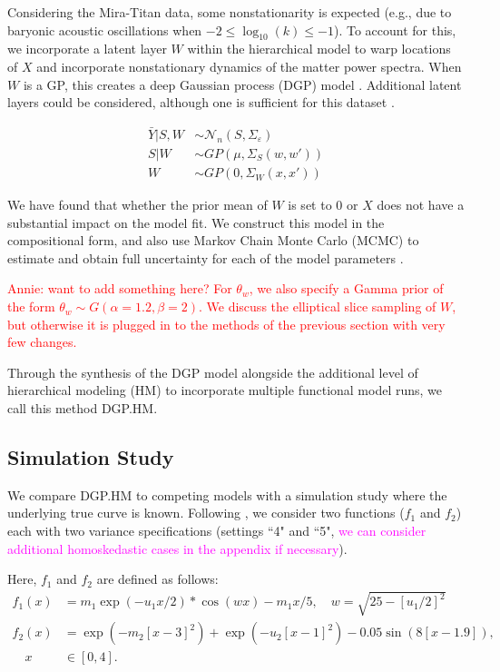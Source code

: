 \documentclass[11pt]{article}
\begin{document}
Considering the Mira-Titan data, some nonstationarity is expected (e.g., due to 
baryonic acoustic oscillations when $-2 \leq \log_{10}(k) \leq -1$). To account 
for this, we incorporate a latent layer $W$ within the hierarchical model to warp 
locations of $X$ and incorporate nonstationary dynamics of the matter power spectra. 
When $W$ is a GP, this creates a deep Gaussian process (DGP) model \citep{damianou2013deep}. 
Additional latent layers could be considered, although one is sufficient for this 
dataset \citep{dunlop2018deep}.

\begin{align}
\bar Y|S,W &\sim \mathcal{N}_n(S,\Sigma_\varepsilon) \\
S|W &\sim GP\left(\mu, \Sigma_S(w,w')\right) \\
W &\sim GP\left(0, \Sigma_W(x,x')\right)
\end{align}

We have found that whether the prior mean of $W$ is set to 0 or $X$ 
\citep[which would indicate stationarity apriori,][]{schmidt2003bayesian} does not 
have a substantial impact on the model fit. We construct this model in the 
compositional form, and also use Markov Chain Monte Carlo (MCMC) to estimate and 
obtain full uncertainty for each of the model parameters \citep{sauer2023active}.

\textcolor{red}{Annie: want to add something here? For $\theta_w$, we also specify 
a Gamma prior of the form $\theta_w \sim G(\alpha=1.2, \beta=2)$. We discuss the 
elliptical slice sampling of $W$, but otherwise it is plugged in to the methods 
of the previous section with very few changes.}

Through the synthesis of the DGP model alongside the additional level of hierarchical 
modeling (HM) to incorporate multiple functional model runs, we call this method DGP.HM.

\subsection{Simulation Study}
\label{subsec:sim}

We compare DGP.HM to competing models with a simulation study where the underlying 
true curve is known. Following \cite{moran2024dpc}, we consider two functions 
($f_1$ and $f_2$) each with two variance specifications (settings ``4" and ``5", 
\textcolor{magenta}{we can consider additional homoskedastic cases in the appendix if necessary}). 

Here, $f_1$ and $f_2$ are defined as follows:
\begin{align}
  f_1(x) &= m_1 \exp(-u_1x/2) * \cos(wx) - m_1x/5, \quad w=\sqrt{25-[u_1/2]^2} \\
  f_2(x) &= \exp(-m_2[x-3]^2)+\exp(-u_2[x-1]^2)-0.05\sin(8[x-1.9]), \\ 
  \quad x &\in [0,4].
\end{align}
\end{document}
